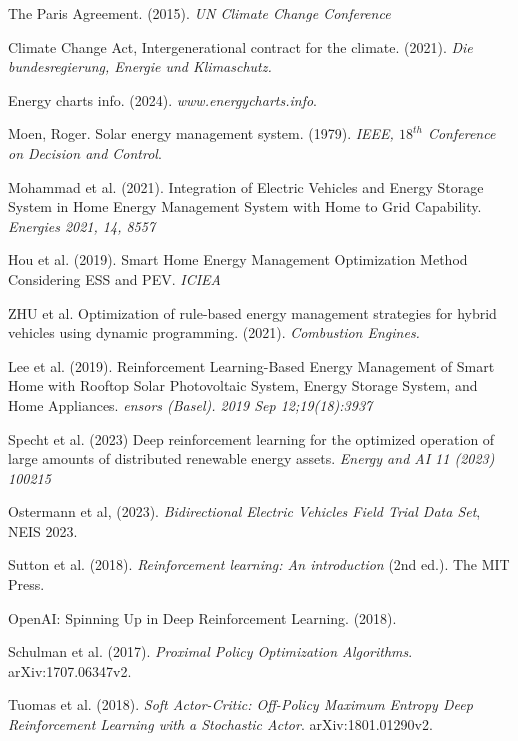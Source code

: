 
\begin{large}

 The Paris Agreement. (2015). \emph{UN Climate Change Conference}

  Climate Change Act, Intergenerational contract for the climate. (2021). \emph{Die bundesregierung, Energie und Klimaschutz.} 

 Energy charts info. (2024). \emph{www.energycharts.info}.

 Moen, Roger. Solar energy management system. (1979). \emph{IEEE, $18^{th}$ Conference on Decision and Control}. 

 Mohammad et al. (2021). Integration of Electric Vehicles and Energy Storage System in Home Energy Management System with Home to Grid Capability. \emph{Energies 2021, 14, 8557}

 Hou et al. (2019). Smart Home Energy Management Optimization Method Considering ESS and PEV. \emph{ICIEA} 

 ZHU et al. Optimization of rule-based energy management strategies for hybrid vehicles using
dynamic programming. (2021). \emph{Combustion Engines.}


Lee et al. (2019). Reinforcement Learning-Based Energy Management of Smart Home with Rooftop Solar Photovoltaic System, Energy Storage System, and Home Appliances. \emph{ensors (Basel). 2019 Sep 12;19(18):3937}

Specht et al. (2023) Deep reinforcement learning for the optimized operation of large amounts of distributed renewable energy assets. \emph{Energy and AI 11 (2023) 100215}

 Ostermann et al, (2023). \emph{Bidirectional Electric Vehicles Field Trial Data Set}, NEIS 2023.

Sutton et al. (2018). \emph{Reinforcement learning: An introduction} (2nd ed.). The MIT Press.

 OpenAI: Spinning Up in Deep Reinforcement Learning. (2018).

Schulman et al. (2017). \emph{Proximal Policy Optimization Algorithms}. arXiv:1707.06347v2.

Tuomas et al. (2018). \emph{Soft Actor-Critic: Off-Policy Maximum Entropy Deep Reinforcement Learning with a Stochastic Actor}. arXiv:1801.01290v2.


\end{large}

